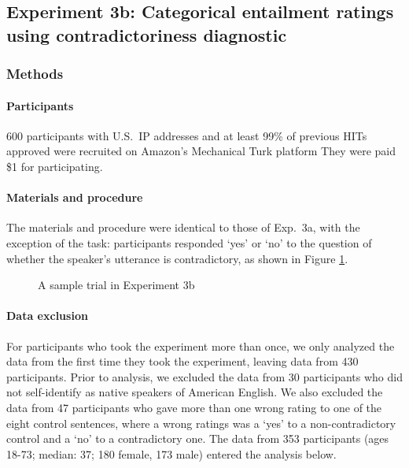 \documentclass[11pt,fleqn]{article}
\newcommand{\6}{\mbox{$[\hspace*{-.6mm}[$}}
\newcommand{\9}{\mbox{$]\hspace*{-.6mm}]$}}
\begin{document}
{\subsection{Experiment 3b: Categorical entailment ratings using contradictoriness diagnostic}
\label{s32}

\subsubsection{Methods}

\paragraph{Participants} 600 participants with U.S.\ IP addresses and at least 99\% of previous HITs approved were recruited on Amazon's Mechanical Turk platform They were paid \$1 for participating.

\paragraph{Materials and procedure} The materials and procedure were identical to those of Exp.~3a, with the exception of the task: participants responded `yes' or `no' to the question of whether the speaker's utterance is contradictory, as shown in Figure \ref{fig-trial-exp3b}.

\begin{figure}[h!]
\begin{center}
\end{center}
\caption{A sample trial in Experiment 3b}\label{fig-trial-exp3b}
\end{figure}


\paragraph{Data exclusion} For participants who took the experiment more than once, we only analyzed the data from the first time they took the experiment, leaving data from 430 participants. Prior to analysis, we excluded the data from 30 participants who did not self-identify as native speakers of American English. We also excluded the data from 47 participants who gave more than one wrong rating to one of the eight control sentences, where a wrong ratings was a `yes' to a non-contradictory control and a `no' to a contradictory one. The data from 353 participants (ages 18-73; median: 37; 180 female, 173 male) entered the analysis below. 
    


}
\end{document}
